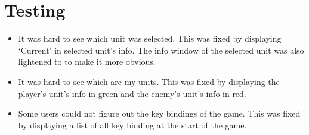 \section{Testing}
\begin{itemize}
	\item It was hard to see which unit was selected. This was fixed by  displaying `Current' in selected unit's info. The info window of the selected unit was also lightened to to make it more obvious.
	
	\item It was hard to see which are my units. This was fixed by displaying the player's unit's info in green and the enemy's unit's info in red. 
	
	\item Some users could not figure out the key bindings of the game. This was fixed by displaying a list of all key binding at the start of the game.
\end{itemize}